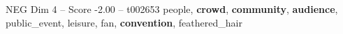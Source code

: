 \begin{textsample}{NEG Dim 4 – Score -2.00 – t002653}  \label{ex:f4_neg_017}
people, \textbf{crowd}, \textbf{community}, \textbf{audience}, public\_event, leisure, fan, \textbf{convention}, feathered\_hair

\end{textsample}
